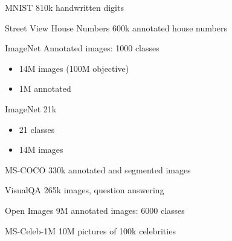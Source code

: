 \begin{frame}{MNIST}
  810k handwritten digits
\end{frame}

\begin{frame}{Street View House Numbers}
  600k annotated house numbers
\end{frame}

\begin{frame}{ImageNet}
  Annotated images: 1000 classes
  \begin{itemize}
    \item 14M images (100M objective)
    \item 1M annotated
  \end{itemize}
\end{frame}

\begin{frame}{ImageNet 21k}
  \begin{itemize}
    \item 21 classes
    \item 14M images
  \end{itemize}
\end{frame}

\begin{frame}{MS-COCO}
   330k annotated and segmented images
\end{frame}

\begin{frame}{VisualQA}
  265k images, question answering
\end{frame}

\begin{frame}{Open Images}
  9M annotated images: 6000 classes
\end{frame}

\begin{frame}{MS-Celeb-1M}
  10M pictures of 100k celebrities
\end{frame}
